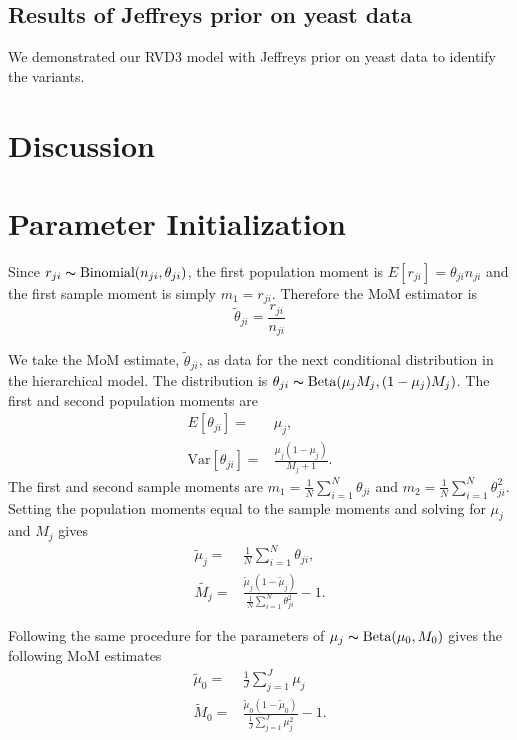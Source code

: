 \documentclass[11pt,reqno]{amsart}
\begin{document}
\subsection{Results of Jeffreys prior on yeast data}

We demonstrated our RVD3 model with Jeffreys prior on yeast data to identify the variants.


\section{Discussion}


\appendix

\section{Parameter Initialization}\label{sec:appendix_mom}
Since $r_{ji} \thicksim \text{Binomial}(n_{ji}, \theta_{ji})$, the first population moment is  $E[r_{ji}] = \theta_{ji} n_{ji}$ and the first sample moment is simply $m_1 = r_{ji}$. Therefore the MoM estimator is
\begin{equation}
	\tilde{\theta}_{ji} = \frac{r_{ji}} {n_{ji}}
\end{equation}

We take the MoM estimate, $\tilde{\theta}_{ji}$, as data for the next conditional distribution in the hierarchical model. The distribution is $\theta_{ji} \thicksim \text{Beta}(\mu_jM_j, (1-\mu_j)M_j)$. The first and second population moments are
\begin{eqnarray}
	E[\theta_{ji}] =& \mu_j,\\
	\text{Var}[\theta_{ji}] =& \frac{\mu_j(1-\mu_j)} { M_j + 1 }.
\end{eqnarray}
The first and second sample moments are $m_1 = \frac{1}{N}\sum_{i=1}^N \theta_{ji}$ and $m_2 = \frac{1}{N}\sum_{i=1}^N \theta_{ji}^2$. Setting the population moments equal to the sample moments and solving for $\mu_j$ and $M_j$ gives
\begin{eqnarray}
	\tilde{\mu}_j =& \frac{1}{N} \sum_{i=1}^N \theta_{ji}, \\
	\tilde{M_j} =& \frac{ \tilde{\mu}_j (1 - \tilde{\mu}_j ) } { \frac{1}{N} \sum_{i=1}^N \theta_{ji}^2 } -1.
\end{eqnarray}

Following the same procedure for the parameters of $\mu_j \thicksim \text{Beta}(\mu_0, M_0)$ gives the following MoM estimates
\begin{eqnarray}
	\tilde{\mu}_0 =& \frac{1}{J} \sum_{j=1}^J \mu_j \\
	\tilde{M}_0 =& \frac{ \tilde{\mu}_0 (1 - \tilde{\mu}_0 ) } {\frac{1}{J} \sum_{j=1}^J \mu_j^2 } -1.
\end{eqnarray}
\end{document}
